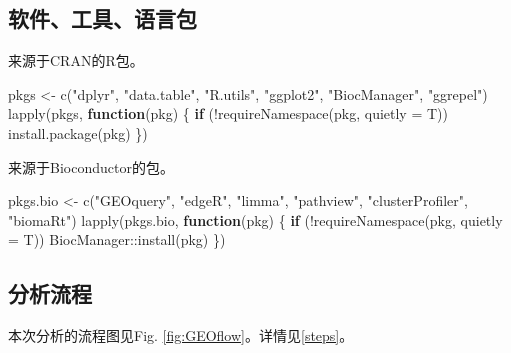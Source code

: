 \documentclass[
]{article}
\newenvironment{Shaded}{\begin{snugshade}}{\end{snugshade}}
\newcommand{\AttributeTok}[1]{\textcolor[rgb]{0.77,0.63,0.00}{#1}}
\newcommand{\ControlFlowTok}[1]{\textcolor[rgb]{0.13,0.29,0.53}{\textbf{#1}}}
\newcommand{\FunctionTok}[1]{\textcolor[rgb]{0.00,0.00,0.00}{#1}}
\newcommand{\NormalTok}[1]{#1}
\newcommand{\OtherTok}[1]{\textcolor[rgb]{0.56,0.35,0.01}{#1}}
\newcommand{\SpecialCharTok}[1]{\textcolor[rgb]{0.00,0.00,0.00}{#1}}
\newcommand{\StringTok}[1]{\textcolor[rgb]{0.31,0.60,0.02}{#1}}
\begin{document}
\hypertarget{ux8f6fux4ef6ux5de5ux5177ux8bedux8a00ux5305}{%
\subsection{软件、工具、语言包}\label{ux8f6fux4ef6ux5de5ux5177ux8bedux8a00ux5305}}

来源于CRAN的R包。

\begin{Shaded}
\begin{Highlighting}[]
\NormalTok{pkgs }\OtherTok{\textless{}{-}} \FunctionTok{c}\NormalTok{(}\StringTok{"dplyr"}\NormalTok{, }\StringTok{"data.table"}\NormalTok{, }\StringTok{"R.utils"}\NormalTok{,}
  \StringTok{"ggplot2"}\NormalTok{, }\StringTok{"BiocManager"}\NormalTok{, }\StringTok{"ggrepel"}\NormalTok{)}
\FunctionTok{lapply}\NormalTok{(pkgs,}
    \ControlFlowTok{function}\NormalTok{(pkg) \{}
      \ControlFlowTok{if}\NormalTok{ (}\SpecialCharTok{!}\FunctionTok{requireNamespace}\NormalTok{(pkg, }\AttributeTok{quietly =}\NormalTok{ T))}
        \FunctionTok{install.package}\NormalTok{(pkg)}
\NormalTok{    \})}
\end{Highlighting}
\end{Shaded}

来源于Bioconductor的包。

\begin{Shaded}
\begin{Highlighting}[]
\NormalTok{pkgs.bio }\OtherTok{\textless{}{-}} \FunctionTok{c}\NormalTok{(}\StringTok{"GEOquery"}\NormalTok{, }\StringTok{"edgeR"}\NormalTok{, }\StringTok{"limma"}\NormalTok{, }\StringTok{"pathview"}\NormalTok{,}
  \StringTok{"clusterProfiler"}\NormalTok{, }\StringTok{"biomaRt"}\NormalTok{)}
\FunctionTok{lapply}\NormalTok{(pkgs.bio,}
    \ControlFlowTok{function}\NormalTok{(pkg) \{}
      \ControlFlowTok{if}\NormalTok{ (}\SpecialCharTok{!}\FunctionTok{requireNamespace}\NormalTok{(pkg, }\AttributeTok{quietly =}\NormalTok{ T))}
\NormalTok{        BiocManager}\SpecialCharTok{::}\FunctionTok{install}\NormalTok{(pkg)}
\NormalTok{    \})}
\end{Highlighting}
\end{Shaded}

\hypertarget{ux5206ux6790ux6d41ux7a0b}{%
\subsection{分析流程}\label{ux5206ux6790ux6d41ux7a0b}}

本次分析的流程图见Fig. \ref{fig:GEOflow}。详情见\ref{steps}。
\end{document}
